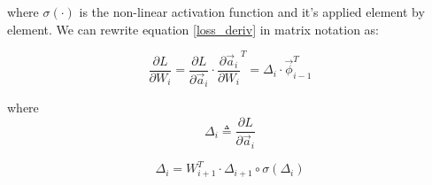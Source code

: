 where $\sigma(\cdot)$ is the non-linear activation function and it's applied element by element.
We can rewrite equation \ref{loss_deriv} in matrix notation as:

\begin{equation}
 \frac{\partial L}{\partial W_i} = \frac{\partial L}{\partial \vec{a}_{i}} \cdot\frac{\partial \vec{a}_{i}}{\partial W_i}^T =
 \Delta_i \cdot \vec{\phi}_{i-1}^T
\end{equation}

where
\begin{equation}
\Delta_i  \triangleq  \frac{\partial L}{\partial \vec{a}_{i}} 
\end{equation}

\begin{equation}
 \Delta_i = W_{i+1}^T \cdot \Delta_{i+1} \circ \sigma(\Delta_i)
\end{equation} 
